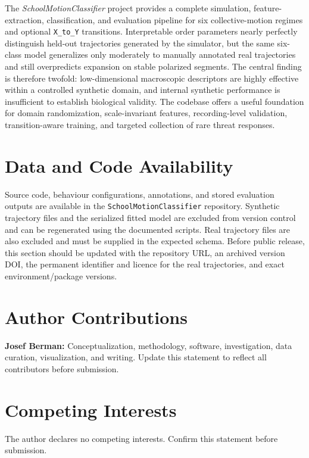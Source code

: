 \documentclass[11pt]{article}
\begin{document}
The \textit{SchoolMotionClassifier} project provides a complete simulation, feature-extraction,
classification, and evaluation pipeline for six collective-motion regimes and optional
\texttt{X\_to\_Y} transitions. Interpretable order parameters nearly perfectly distinguish held-out
trajectories generated by the simulator, but the same six-class model generalizes only moderately to
manually annotated real trajectories and still overpredicts expansion on stable polarized segments. The
central finding is therefore twofold: low-dimensional macroscopic descriptors are highly effective within
a controlled synthetic domain, and internal synthetic performance is insufficient to establish biological
validity. The codebase offers a useful foundation for domain randomization, scale-invariant features,
recording-level validation, transition-aware training, and targeted collection of rare threat responses.

\section*{Data and Code Availability}

Source code, behaviour configurations, annotations, and stored evaluation outputs are available in the
\texttt{SchoolMotionClassifier} repository. Synthetic trajectory files and the serialized fitted model
are excluded from version control and can be regenerated using the documented scripts. Real trajectory
files are also excluded and must be supplied in the expected schema. Before public release, this section
should be updated with the repository URL, an archived version DOI, the permanent identifier and licence
for the real trajectories, and exact environment/package versions.

\section*{Author Contributions}

\textbf{Josef Berman:} Conceptualization, methodology, software, investigation, data curation,
visualization, and writing. Update this statement to reflect all contributors before submission.

\section*{Competing Interests}

The author declares no competing interests. Confirm this statement before submission.
\end{document}
